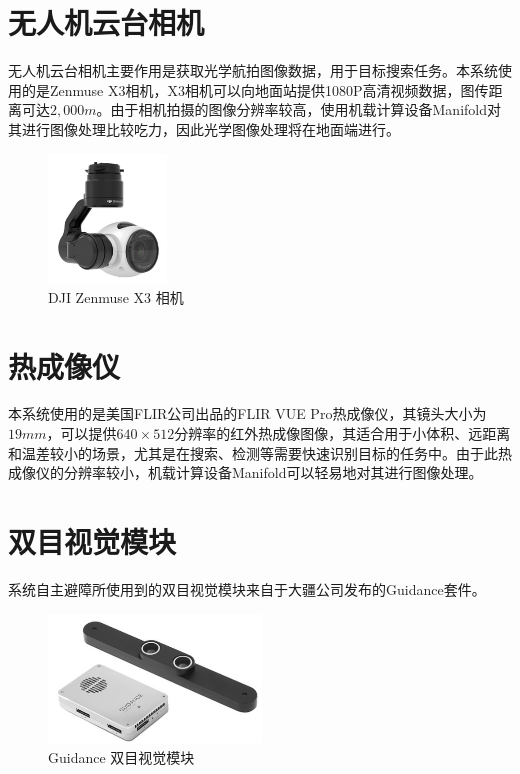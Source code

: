 \section{无人机云台相机}


无人机云台相机主要作用是获取光学航拍图像数据，用于目标搜索任务。本系统使用的是Zenmuse X3相机，X3相机可以向地面站提供1080P高清视频数据，图传距离可达$2,000m$。由于相机拍摄的图像分辨率较高，使用机载计算设备Manifold对其进行图像处理比较吃力，因此光学图像处理将在地面端进行。
\begin{figure}[h]
    \centering
    \includegraphics[height=3.43cm]{figures/3-3-X3.png}
    \caption{DJI Zenmuse X3 相机}\label{X3}
\end{figure}



\section{热成像仪}

本系统使用的是美国FLIR公司出品的FLIR VUE Pro热成像仪，其镜头大小为$19mm$，可以提供$640\times512$分辨率的红外热成像图像，其适合用于小体积、远距离和温差较小的场景，尤其是在搜索、检测等需要快速识别目标的任务中。由于此热成像仪的分辨率较小，机载计算设备Manifold可以轻易地对其进行图像处理。



\section{双目视觉模块}

系统自主避障所使用到的双目视觉模块来自于大疆公司发布的Guidance套件。 
\begin{figure}[h]
    \centering
    \includegraphics[height=3.43cm]{figures/3-4-Guidance.png}
    \caption{Guidance 双目视觉模块}\label{Guidance}
\end{figure}

